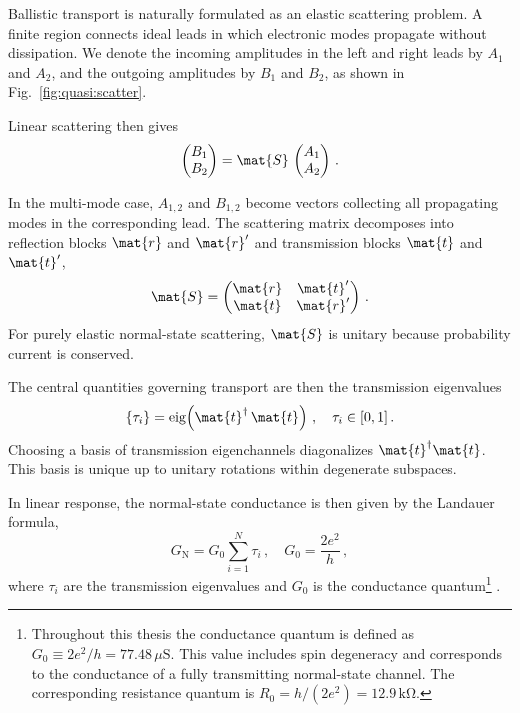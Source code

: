             Ballistic transport is naturally formulated as an elastic scattering problem. A finite region connects ideal leads in which electronic modes propagate without dissipation. We denote the incoming amplitudes in the left and right leads by $A_1$ and $A_2$, and the outgoing amplitudes by $B_1$ and $B_2$, as shown in Fig.~\ref{fig:quasi:scatter}.

            Linear scattering then gives
            \begin{equation}
                \begin{pmatrix} B_1 \\ B_2 \end{pmatrix} = \mat{S}\,\begin{pmatrix} A_1 \\ A_2 \end{pmatrix}\,.
            \end{equation}

            In the multi-mode case, $A_{1,2}$ and $B_{1,2}$ become vectors collecting all propagating modes in the corresponding lead. The scattering matrix decomposes into reflection blocks $\mat{r}$ and $\mat{r}'$ and transmission blocks $\mat{t}$ and $\mat{t}'$,
            \begin{equation}
                \mat{S}
                = \begin{pmatrix} \mat{r} & \mat{t}' \\ \mat{t} & \mat{r}' \end{pmatrix}\,.
            \end{equation}
            For purely elastic normal-state scattering, $\mat{S}$ is unitary because probability current is conserved.

            The central quantities governing transport are then the transmission eigenvalues
            \begin{equation}
                \{\tau_i\} = \operatorname{eig}\!\left(\mat{t}^\dagger\,\mat{t}\right)\,,\quad
                \tau_i\in[0,1]\,.
            \end{equation}
            Choosing a basis of transmission eigenchannels diagonalizes $\mat{t}^\dagger\mat{t}$. This basis is unique up to unitary rotations within degenerate subspaces.

            In linear response, the normal-state conductance is then given by the Landauer formula,
            \begin{equation}
                G_\mathrm{N} = G_0 \sum_{i=1}^N \tau_i\,,
                \quad
                G_0 = \frac{2e^2}{h}\,,
            \end{equation}
            where $\tau_i$ are the transmission eigenvalues and $G_0$ is the conductance quantum\footnote{
                Throughout this thesis the conductance quantum is defined as $G_0 \equiv 2e^2/h = 77.48\,\mu\mathrm{S}$. This value includes spin degeneracy and corresponds to the conductance of a fully transmitting normal-state channel. The corresponding resistance quantum is $R_0 = h/(2e^2) = 12.9\,\mathrm{k\Omega}$.
            } \cite{landauer_electrical_1970,buttiker_four-terminal_1986}.

